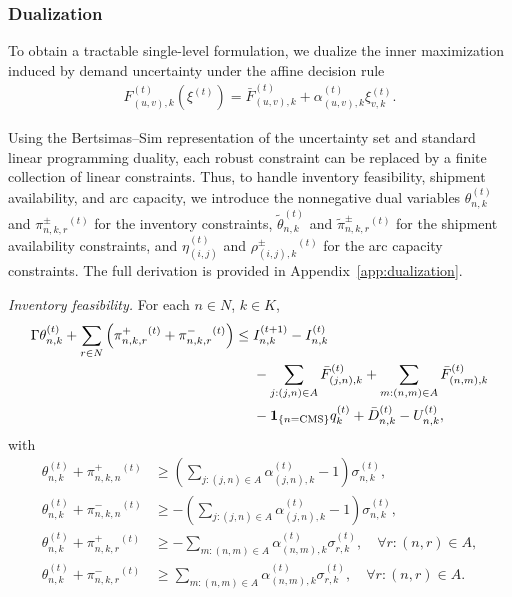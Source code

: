 \documentclass{article}
\begin{document}
\subsubsection{Dualization}
\label{dual}

To obtain a tractable single-level formulation, we dualize the inner maximization induced by demand uncertainty under the affine decision rule
\begin{align}
F_{(u,v),k}^{(t)}(\xi^{(t)})
=
\bar F_{(u,v),k}^{(t)}
+
\alpha_{(u,v),k}^{(t)} \xi_{v,k}^{(t)}.
\end{align}

Using the Bertsimas--Sim representation of the uncertainty set and standard linear programming duality, each robust constraint can be replaced by a finite collection of linear constraints. Thus, to handle inventory feasibility, shipment availability, and arc capacity,  we introduce the nonnegative dual variables $\theta_{n,k}^{(t)}$ and $\pi^{\pm}_{n,k,r}{}^{(t)}$ for the inventory constraints, $\tilde{\theta}_{n,k}^{(t)}$ and $\tilde{\pi}^{\pm}_{n,k,r}{}^{(t)}$ for the shipment availability constraints, and $\eta_{(i,j)}^{(t)}$ and $\rho^{\pm}_{(i,j),k}{}^{(t)}$ for the arc capacity constraints. The full derivation is provided in Appendix~\ref{app:dualization}.

\vspace{0.5em}

\textit{Inventory feasibility.} For each \(n \in N\), \(k \in K\),
\begin{align}
\Gamma \theta_{n,k}^{(t)}
+
\sum_{r \in N}
\left(
\pi^+_{n,k,r}{}^{(t)} + \pi^-_{n,k,r}{}^{(t)}
\right)
\le\;&
I_{n,k}^{(t+1)}
-
I_{n,k}^{(t)}
\notag\\
&-
\sum_{j:(j,n)\in A} \bar F_{(j,n),k}^{(t)}
+
\sum_{m:(n,m)\in A} \bar F_{(n,m),k}^{(t)}
\notag\\
&-
\mathbf{1}_{\{n=\mathrm{CMS}\}} q_k^{(t)}
+
\bar D_{n,k}^{(t)}
-
U_{n,k}^{(t)},
\end{align}
with
\begin{align}
\theta_{n,k}^{(t)} + \pi^+_{n,k,n}{}^{(t)}
&\ge
\left(
\sum_{j:(j,n)\in A} \alpha_{(j,n),k}^{(t)} - 1
\right)\sigma_{n,k}^{(t)}, \\
\theta_{n,k}^{(t)} + \pi^-_{n,k,n}{}^{(t)}
&\ge
-\left(
\sum_{j:(j,n)\in A} \alpha_{(j,n),k}^{(t)} - 1
\right)\sigma_{n,k}^{(t)}, \\
\theta_{n,k}^{(t)} + \pi^+_{n,k,r}{}^{(t)}
&\ge
-\sum_{m:(n,m)\in A} \alpha_{(n,m),k}^{(t)} \sigma_{r,k}^{(t)},
\quad \forall r:(n,r)\in A, \\
\theta_{n,k}^{(t)} + \pi^-_{n,k,r}{}^{(t)}
&\ge
\sum_{m:(n,m)\in A} \alpha_{(n,m),k}^{(t)} \sigma_{r,k}^{(t)},
\quad \forall r:(n,r)\in A.
\end{align}
\end{document}
